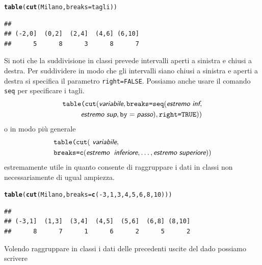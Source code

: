\documentclass[onecolumn,12pt]{book}\usepackage[]{graphicx}\usepackage[]{color}
\makeatletter
\newcommand{\hlnum}[1]{\textcolor[rgb]{0.686,0.059,0.569}{#1}}%
\newcommand{\hlopt}[1]{\textcolor[rgb]{0,0,0}{#1}}%
\newcommand{\hlstd}[1]{\textcolor[rgb]{0.345,0.345,0.345}{#1}}%
\newcommand{\hlkwc}[1]{\textcolor[rgb]{0.333,0.667,0.333}{#1}}%
\newcommand{\hlkwd}[1]{\textcolor[rgb]{0.737,0.353,0.396}{\textbf{#1}}}%
\newenvironment{kframe}{%
 \def\at@end@of@kframe{}%
 \ifinner\ifhmode%
  \def\at@end@of@kframe{\end{minipage}}%
  \begin{minipage}{\columnwidth}%
 \fi\fi%
 \def\FrameCommand##1{\hskip\@totalleftmargin \hskip-\fboxsep
 \colorbox{shadecolor}{##1}\hskip-\fboxsep
     \hskip-\linewidth \hskip-\@totalleftmargin \hskip\columnwidth}%
 \MakeFramed {\advance\hsize-\width
   \@totalleftmargin\z@ \linewidth\hsize
   \@setminipage}}%
 {\par\unskip\endMakeFramed%
 \at@end@of@kframe}
\newenvironment{knitrout}{}{} %
\newcommand{\varia}[1]{\textsl{\textsf{#1}}}
\makeatother
\begin{document}
\begin{knitrout}
\color{fgcolor}\begin{kframe}
\begin{alltt}
\hlkwd{table}\hlstd{(}\hlkwd{cut}\hlstd{(Milano,}\hlkwc{breaks}\hlstd{=tagli))}
\end{alltt}
\begin{verbatim}
## 
## (-2,0]  (0,2]  (2,4]  (4,6] (6,10] 
##      5      8      3      8      7
\end{verbatim}
\end{kframe}
\end{knitrout}
Si noti che la suddivisione in classi prevede intervalli aperti a sinistra e chiusi a destra.
Per suddividere in modo che gli intervalli siano chiusi a sinistra e aperti a destra si specifica il parametro \texttt{right=FALSE}.
Possiamo anche usare il comando \texttt{seq} per specificare i tagli.
 \begin{eqnarray*}
\texttt{table(cut}( \varia{variabile},\texttt{breaks=seq}(\varia{estremo inf},\\
\varia{estremo sup},\texttt{by}=\varia{passo}),\texttt{right=TRUE}))
\end{eqnarray*}
o in modo  pi\`u generale
\begin{eqnarray*}
&\texttt{table(cut}(\varia{ variabile},\\
&\texttt{breaks=c}(\varia{estremo\; inferiore}, \ldots,\varia{estremo superiore}))
\end{eqnarray*}
estremamente utile in quanto consente di raggruppare i dati in classi non necessariamente di ugual ampiezza.
\begin{knitrout}
\color{fgcolor}\begin{kframe}
\begin{alltt}
\hlkwd{table}\hlstd{(}\hlkwd{cut}\hlstd{(Milano,}\hlkwc{breaks}\hlstd{=}\hlkwd{c}\hlstd{(}\hlopt{-}\hlnum{3}\hlstd{,}\hlnum{1}\hlstd{,}\hlnum{3}\hlstd{,}\hlnum{4}\hlstd{,}\hlnum{5}\hlstd{,}\hlnum{6}\hlstd{,}\hlnum{8}\hlstd{,}\hlnum{10}\hlstd{)))}
\end{alltt}
\begin{verbatim}
## 
## (-3,1]  (1,3]  (3,4]  (4,5]  (5,6]  (6,8] (8,10] 
##      8      7      1      6      2      5      2
\end{verbatim}
\end{kframe}
\end{knitrout}
Volendo raggruppare in classi i dati delle precedenti uscite del dado possiamo scrivere
\end{document}
